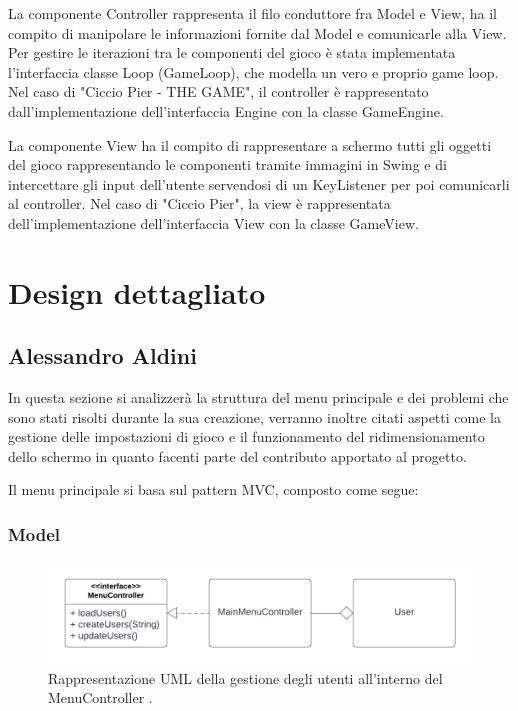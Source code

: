 \documentclass[a4paper,12pt]{report}
\newcommand{\gametitle}{Ciccio Pier - THE GAME}
\begin{document}
La componente Controller rappresenta il filo conduttore fra Model e View, ha il compito di manipolare le informazioni fornite dal Model e comunicarle alla View. Per gestire le iterazioni tra le componenti del gioco è stata implementata l'interfaccia classe Loop (GameLoop), che modella un vero e proprio game loop. Nel caso di "\gametitle", il controller è rappresentato dall'implementazione dell'interfaccia Engine con la classe GameEngine.

La componente View ha il compito di rappresentare a schermo tutti gli oggetti del gioco rappresentando le componenti tramite immagini in Swing e di intercettare gli input dell'utente servendosi di un KeyListener per poi comunicarli al controller. Nel caso di "Ciccio Pier", la view è rappresentata dell'implementazione dell'interfaccia View con la classe GameView.


\section{Design dettagliato}

\subsection*{Alessandro Aldini}

In questa sezione si analizzerà la struttura del menu principale e dei problemi che sono stati risolti durante la sua creazione, verranno inoltre citati aspetti come la gestione delle impostazioni di gioco e il funzionamento del ridimensionamento dello schermo in quanto facenti parte del contributo apportato al progetto. 

Il menu principale si basa sul pattern MVC, composto come segue: 

\subsubsection{Model}

\begin{figure}[H]
\centering{}
\includegraphics[scale=0.7] {img/users.png}
\caption{Rappresentazione UML della gestione degli utenti all'interno del MenuController .}
\label{img:users}
\end{figure}
\end{document}
